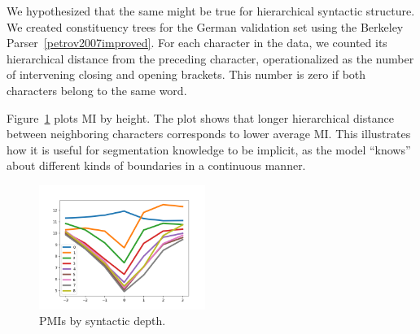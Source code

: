 We hypothesized that the same might be true for hierarchical syntactic structure.
We created constituency trees for the German validation set using the Berkeley Parser~\ref{petrov2007improved}.
For each character in the data, we counted its hierarchical distance from the preceding character, operationalized as the number of intervening closing and opening brackets.
This number is zero if both characters belong to the same word.

Figure~\ref{fig:syntax-depth} plots MI by height.
The plot shows that longer hierarchical distance between neighboring characters corresponds to lower average MI.
This illustrates how it is useful for segmentation knowledge to be implicit, as the model ``knows'' about different kinds of boundaries in a continuous manner.

\begin{figure}
\includegraphics[width=0.48\textwidth]{figures/segmentation-profile-pmis-german-all-heights.png}
\caption{PMIs by syntactic depth.}\label{fig:syntax-depth}
\end{figure}


